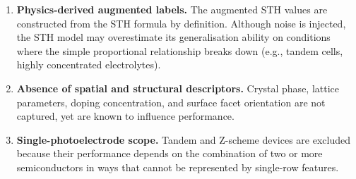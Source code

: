 \begin{enumerate}
  \item \textbf{Physics-derived augmented labels.}
        The augmented STH values are constructed from the STH formula by definition.
        Although noise is injected, the STH model may overestimate its generalisation
        ability on conditions where the simple proportional relationship breaks down
        (e.g., tandem cells, highly concentrated electrolytes).

  \item \textbf{Absence of spatial and structural descriptors.}
        Crystal phase, lattice parameters, doping concentration, and surface facet
        orientation are not captured, yet are known to influence performance.

  \item \textbf{Single-photoelectrode scope.}
        Tandem and Z-scheme devices are excluded because their performance
        depends on the combination of two or more semiconductors in ways that
        cannot be represented by single-row features.
\end{enumerate}
